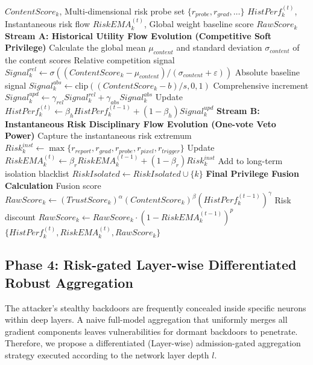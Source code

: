 \documentclass[runningheads]{llncs}
\begin{document}
\begin{algorithm}[htbp]
\caption{Dual-stream Orthogonal Trust State Evolution (HistPerf \& RiskEMA)}
\label{alg:phase3}
\begin{algorithmic}[1]
\REQUIRE $ContentScore_k$, Multi-dimensional risk probe set $\{r_{probe}, r_{grad}, \dots\}$
\ENSURE $HistPerf_k^{(t)}$, Instantaneous risk flow $RiskEMA_k^{(t)}$, Global weight baseline score $RawScore_k$
\STATE \textbf{Stream A: Historical Utility Flow Evolution (Competitive Soft Privilege)}
\STATE Calculate the global mean $\mu_{content}$ and standard deviation $\sigma_{content}$ of the content scores
    \STATE Relative competition signal $Signal_k^{rel} \leftarrow \sigma((ContentScore_k - \mu_{content})/(\sigma_{content} + \varepsilon))$
    \STATE Absolute baseline signal $Signal_k^{abs} \leftarrow \mathrm{clip}((ContentScore_k - b)/s, 0, 1)$
    \STATE Comprehensive increment $Signal_k^{upd} \leftarrow \gamma_{rel} Signal_k^{rel} + \gamma_{abs} Signal_k^{abs}$
    \STATE Update $HistPerf_k^{(t)} \leftarrow \beta_h HistPerf_k^{(t-1)} + (1 - \beta_h) Signal_k^{upd}$
\ENDFOR
\STATE \textbf{Stream B: Instantaneous Risk Disciplinary Flow Evolution (One-vote Veto Power)}
    \STATE Capture the instantaneous risk extremum $Risk_k^{inst} \leftarrow \max\{r_{report}, r_{grad}, r_{probe}, r_{pixel}, r_{trigger}\}$
    \STATE Update $RiskEMA_k^{(t)} \leftarrow \beta_r RiskEMA_k^{(t-1)} + (1-\beta_r) Risk_k^{inst}$
        \STATE Add to long-term isolation blacklist $RiskIsolated \leftarrow RiskIsolated \cup \{k\}$
    \ENDIF
\ENDFOR
\STATE \textbf{Final Privilege Fusion Calculation}
    \STATE Fusion score $RawScore_k \leftarrow (TrustScore_k)^\alpha (ContentScore_k)^\beta (HistPerf_k^{(t-1)})^\gamma$
    \STATE Risk discount $RawScore_k \leftarrow RawScore_k \cdot (1 - RiskEMA_k^{(t-1)})^p$
\ENDFOR
\RETURN $\{HistPerf_k^{(t)}, RiskEMA_k^{(t)}, RawScore_k\}$
\end{algorithmic}
\end{algorithm}

\subsection{Phase 4: Risk-gated Layer-wise Differentiated Robust Aggregation}
The attacker's stealthy backdoors are frequently concealed inside specific neurons within deep layers. A naive full-model aggregation that uniformly merges all gradient components leaves vulnerabilities for dormant backdoors to penetrate. Therefore, we propose a differentiated (Layer-wise) admission-gated aggregation strategy executed according to the network layer depth $l$.
\end{document}
